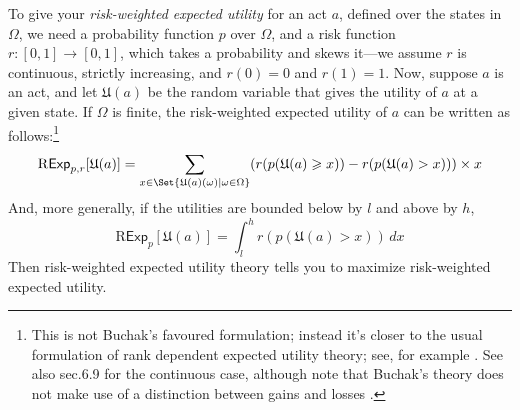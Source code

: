 \documentclass[a4paper,final]{article}
\newcommand\Exp{\mathsf{Exp}}
\newcommand\RExp{\mathrm{R}\Exp} %
\newcommand\U{\mathfrak{U}} %
\newcommand{\todoold}[2][]{\todo[backgroundcolor=white,bordercolor=orange!10,linecolor=gray!10, #1,caption={},textcolor=gray]{Pre-rev: #2}}
\newcommand\SetDelimiter[1][]{
	\nonscript\,#1\vert \allowbreak \nonscript\,\mathopen{}}
\providecommand\given{\SetDelimiter}
\renewcommand{\geq}{\geqslant}
\newenvironment{CCM rewritten}
{\begingroup\color{blue}} %
{\endgroup}              %
\begin{document}
To give your \emph{risk-weighted expected utility} for an act $a$, defined over the states in $\Omega$, we need a probability function $p$ over $\Omega$, and a risk function $r : [0, 1] \rightarrow [0, 1]$, which takes a probability and skews it---we assume $r$ is continuous, strictly increasing, and $r(0)= 0$ and $r(1) = 1$. Now, suppose $a$ is an act, and let $\U(a)$ be the random variable that gives the utility of $a$ at a given state. 
If $\Omega$ is finite, the risk-weighted expected utility of $a$ can be written as follows:\footnote{This is not Buchak's favoured formulation; instead it's closer to the usual formulation of rank dependent expected utility theory; see, for example \citep[ch.6]{wakker2010prospect}.  See also sec.6.9 for the continuous case, although note that Buchak's theory does not make use of a distinction between gains and losses \citep[see][p59]{buchak2014rr}. }%
$$
\RExp_{p, r}[\U(a)] = \sum_{x \in \Set{\U(a)(\omega)\given \omega \in \Omega}} (r(p(\U(a) \geq x)) - r(p(\U(a) > x)))\times x
$$
And, more generally, if the utilities are bounded below by $l$ and above by $h$,
$$
\RExp_p[\U(a)] = \int^h_{l} r(p(\U(a) > x))\, dx
$$
Then risk-weighted expected utility theory tells you to maximize risk-weighted expected utility.


\end{document}
